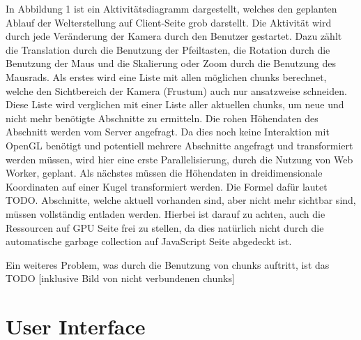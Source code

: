 In Abbildung 1 ist ein Aktivitätsdiagramm dargestellt, welches den geplanten Ablauf der Welterstellung auf Client-Seite grob darstellt. Die Aktivität wird durch jede Veränderung der Kamera durch den Benutzer gestartet. Dazu zählt die Translation durch die Benutzung der Pfeiltasten, die Rotation durch die Benutzung der Maus und die Skalierung oder Zoom durch die Benutzung des Mausrads. Als erstes wird eine Liste mit allen möglichen chunks berechnet, welche den Sichtbereich der Kamera (Frustum) auch nur ansatzweise schneiden. Diese Liste wird verglichen mit einer Liste aller aktuellen chunks, um neue und nicht mehr benötigte Abschnitte zu ermitteln. Die rohen Höhendaten des Abschnitt werden vom Server angefragt. Da dies noch keine Interaktion mit OpenGL benötigt und potentiell mehrere Abschnitte angefragt und transformiert werden müssen, wird hier eine erste Parallelisierung, durch die Nutzung von Web Worker, geplant. Als nächstes müssen die Höhendaten in dreidimensionale Koordinaten auf einer Kugel transformiert werden. Die Formel dafür lautet TODO. Abschnitte, welche aktuell vorhanden sind, aber nicht mehr sichtbar sind, müssen vollständig entladen werden. Hierbei ist darauf zu achten, auch die Ressourcen auf GPU Seite frei zu stellen, da dies natürlich nicht durch die automatische garbage collection auf JavaScript Seite abgedeckt ist. 

Ein weiteres Problem, was durch die Benutzung von chunks auftritt, ist das TODO [inklusive Bild von nicht verbundenen chunks]


\section{User Interface}
